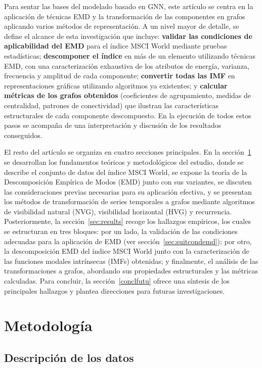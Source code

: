 \documentclass[11pt,a4paper]{article}
\begin{document}
Para sentar las bases del modelado basado en GNN, este artículo se centra en la aplicación de técnicas EMD y la transformación de las componentes en grafos aplicando varios métodos de representación. A un nivel mayor de detalle, se define el alcance de esta investigación que incluye: \textbf{validar las condiciones de aplicabilidad del EMD} para el índice MSCI World mediante pruebas estadísticas; \textbf{descomponer el índice} en más de un elemento utilizando técnicas EMD, con una caracterización exhaustiva de los atributos de energía, varianza, frecuencia y amplitud de cada componente; \textbf{convertir todas las IMF} en representaciones gráficas utilizando algoritmos ya existentes; y \textbf{calcular métricas de los grafos obtenidos} (coeficientes de agrupamiento, medidas de centralidad, patrones de conectividad) que ilustran las características estructurales de cada componente descompuesto. En la ejecución de todos estos pasos se acompaña de una interpretación y discusión de los resultados conseguidos. 

El resto del artículo se organiza en cuatro secciones principales. En la sección~\ref{sec:methodology} se desarrollan los fundamentos teóricos y metodológicos del estudio, donde se describe el conjunto de datos del índice MSCI World, se expone la teoría de la Descomposición Empírica de Modos (EMD) junto con sus variantes, se discuten las consideraciones previas necesarias para su aplicación efectiva, y se presentan los métodos de transformación de series temporales a grafos mediante algoritmos de visibilidad natural (NVG), visibilidad horizontal (HVG) y recurrencia. Posteriormente, la sección~\ref{sec:results} recoge los hallazgos empíricos, los cuales se estructuran en tres bloques: por un lado, la validación de las condiciones adecuadas para la aplicación de EMD (ver sección~\ref{sec:suitcondemd}); por otro, la descomposición EMD del índice MSCI World junto con la caracterización de las funciones modales intrínsecas (IMFs) obtenidas; y finalmente, el análisis de las transformaciones a grafos, abordando sus propiedades estructurales y las métricas calculadas. Para concluir, la sección~\ref{conclfutu} ofrece una síntesis de los principales hallazgos y plantea direcciones para futuras investigaciones.

\section{Metodología}
\label{sec:methodology}

\subsection{Descripción de los datos}
\end{document}
